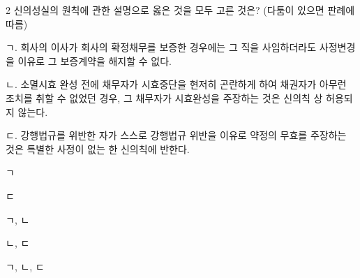\begin{question}{2}
신의성실의 원칙에 관한 설명으로 옳은 것을 모두 고른 것은? (다툼이 있으면 판례에 따름)
\begin{framedtext}
ㄱ. 회사의 이사가 회사의 확정채무를 보증한 경우에는 그 직을 사임하더라도 사정변경을 이유로 그 보증계약을 해지할 수 없다. \par
ㄴ. 소멸시효 완성 전에 채무자가 시효중단을 현저히 곤란하게 하여 채권자가 아무런 조치를 취할 수 없었던 경우, 그 채무자가 시효완성을 주장하는 것은 신의칙 상 허용되지 않는다. \par
ㄷ. 강행법규를 위반한 자가 스스로 강행법규 위반을 이유로 약정의 무효를 주장하는 것은 특별한 사정이 없는 한 신의칙에 반한다. \par
\end{framedtext}
\begin{choices}
  \item ㄱ
  \item ㄷ
  \item ㄱ, ㄴ
  \item ㄴ, ㄷ
  \item ㄱ, ㄴ, ㄷ
\end{choices}
\end{question}
